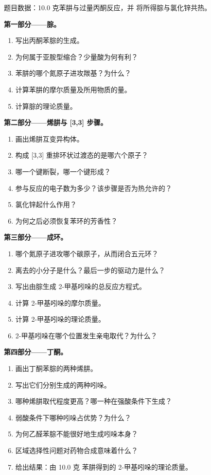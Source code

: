 \begin{problem}
\label{pb:b3:heterocycles:1}
题目数据：10.0 克苯肼与过量丙酮反应，并
将所得腙与氯化锌共热。

\medskip\noindent\textbf{第一部分——腙。}
\begin{enumerate}
  \item 写出丙酮苯腙的生成。
  \item 为何属于亚胺型缩合？少量酸为何有利？
  \item 苯肼的哪个氮原子进攻羰基？为什么？
  \item 计算苯肼的摩尔质量及所用物质的量。
  \item 计算腙的理论质量。
\end{enumerate}

\medskip\noindent\textbf{第二部分——烯肼与 [3,3] 步骤。}
\begin{enumerate}[resume]
  \item 画出烯肼互变异构体。
  \item 构成 [3,3] 重排环状过渡态的是哪六个原子？
  \item 哪一个键断裂，哪一个键形成？
  \item 参与反应的电子数为多少？该步骤是否为热允许的？
  \item 氯化锌起什么作用？
  \item 为何之后必须恢复苯环的芳香性？
\end{enumerate}

\medskip\noindent\textbf{第三部分——成环。}
\begin{enumerate}[resume]
  \item 哪个氮原子进攻哪个碳原子，从而闭合五元环？
  \item 离去的小分子是什么？最后一步的驱动力是什么？
  \item 写出由腙生成 2-甲基吲哚的总反应方程式。
  \item 计算 2-甲基吲哚的摩尔质量。
  \item 计算 2-甲基吲哚的理论质量。
  \item 2-甲基吲哚在哪个位置发生亲电取代？为什么？
\end{enumerate}

\medskip\noindent\textbf{第四部分——丁酮。}
\begin{enumerate}[resume]
  \item 画出丁酮苯腙的两种烯肼。
  \item 写出它们分别生成的两种吲哚。
  \item 哪种烯肼取代程度更高？哪一种在强酸条件下生成？
  \item 弱酸条件下哪种吲哚占优势？为什么？
  \item 为何乙醛苯腙不能很好地生成吲哚本身？
  \item 区域选择性问题对药物合成意味着什么？
  \item 给出结果：由 10.0 克
        苯肼得到的 2-甲基吲哚的理论质量。
\end{enumerate}
\end{problem}
